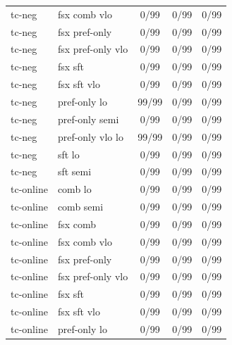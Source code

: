 \documentclass[10pt,landscape]{article}
\begin{document}
\begin{tabular}{llccc}
tc-neg & fsx comb vlo & \cellcolor{missing}0/99 & \cellcolor{missing}0/99 & \cellcolor{missing}0/99 \\
tc-neg & fsx pref-only & \cellcolor{missing}0/99 & \cellcolor{missing}0/99 & \cellcolor{missing}0/99 \\
tc-neg & fsx pref-only vlo & \cellcolor{missing}0/99 & \cellcolor{missing}0/99 & \cellcolor{missing}0/99 \\
tc-neg & fsx sft & \cellcolor{missing}0/99 & \cellcolor{missing}0/99 & \cellcolor{missing}0/99 \\
tc-neg & fsx sft vlo & \cellcolor{missing}0/99 & \cellcolor{missing}0/99 & \cellcolor{missing}0/99 \\
tc-neg & pref-only lo & \cellcolor{done}99/99 & \cellcolor{missing}0/99 & \cellcolor{missing}0/99 \\
tc-neg & pref-only semi & \cellcolor{missing}0/99 & \cellcolor{missing}0/99 & \cellcolor{missing}0/99 \\
tc-neg & pref-only vlo lo & \cellcolor{done}99/99 & \cellcolor{missing}0/99 & \cellcolor{missing}0/99 \\
tc-neg & sft lo & \cellcolor{missing}0/99 & \cellcolor{missing}0/99 & \cellcolor{missing}0/99 \\
tc-neg & sft semi & \cellcolor{missing}0/99 & \cellcolor{missing}0/99 & \cellcolor{missing}0/99 \\
tc-online & comb lo & \cellcolor{missing}0/99 & \cellcolor{missing}0/99 & \cellcolor{missing}0/99 \\
tc-online & comb semi & \cellcolor{missing}0/99 & \cellcolor{missing}0/99 & \cellcolor{missing}0/99 \\
tc-online & fsx comb & \cellcolor{missing}0/99 & \cellcolor{missing}0/99 & \cellcolor{missing}0/99 \\
tc-online & fsx comb vlo & \cellcolor{missing}0/99 & \cellcolor{missing}0/99 & \cellcolor{missing}0/99 \\
tc-online & fsx pref-only & \cellcolor{missing}0/99 & \cellcolor{missing}0/99 & \cellcolor{missing}0/99 \\
tc-online & fsx pref-only vlo & \cellcolor{missing}0/99 & \cellcolor{missing}0/99 & \cellcolor{missing}0/99 \\
tc-online & fsx sft & \cellcolor{missing}0/99 & \cellcolor{missing}0/99 & \cellcolor{missing}0/99 \\
tc-online & fsx sft vlo & \cellcolor{missing}0/99 & \cellcolor{missing}0/99 & \cellcolor{missing}0/99 \\
tc-online & pref-only lo & \cellcolor{missing}0/99 & \cellcolor{missing}0/99 & \cellcolor{missing}0/99 \\

\end{tabular}
\end{document}

